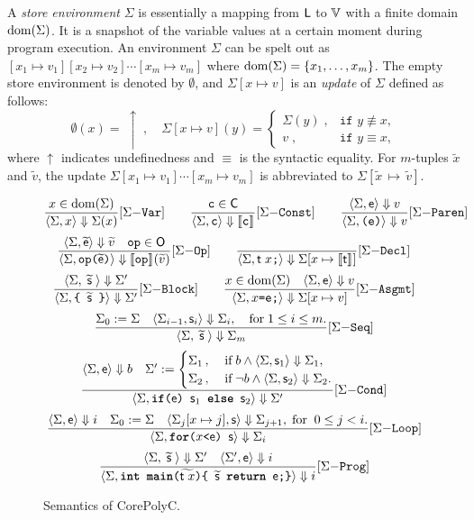 \documentclass[runningheads]{llncs}
\begin{document}
A \textit{store environment} $\Sigma$ is essentially a mapping from $\mathsf{L}$ to $\mathbb{V}$ with a finite domain $\mathrm{dom}(\Sigma)$.
It is a snapshot of the variable values at a certain moment during program execution.
An environment $\Sigma$ can be spelt out as $[x_1\mapsto v_1][x_2\mapsto v_2]\cdots[x_m\mapsto v_m]$ where $\mathrm{dom}(\Sigma)=\{x_1,\dots,x_m\}$.
The empty store environment is denoted by $\emptyset$, and $\Sigma[x\mapsto v]$ is an \textit{update} of $\Sigma$ defined as follows:
\begin{equation}
    \emptyset(x)= \;\uparrow\;,\quad\Sigma[x\mapsto v](y)=\begin{cases}\Sigma(y)\;, &\texttt{if }y\not\equiv x, \\v\;, &\texttt{if }y\equiv x, \end{cases}
\end{equation}
where $\uparrow$ indicates undefinedness and $\equiv$ is the syntactic equality.
For $m$-tuples $\widetilde{x}$ and $\widetilde{v}$, the update $\Sigma[x_1\mapsto v_1]\cdots[x_m\mapsto v_m]$ is abbreviated to $\Sigma[\widetilde{x}\,\mapsto\,\widetilde{v}]$.


\begin{figure}[t]
    \centering
    \[
    \frac{x\in\mathrm{dom}(\Sigma)}{\langle\Sigma,x\rangle\Downarrow{\Sigma(x)}}[\Sigma\mathtt{-Var}]\qquad
    \frac{\mathtt{c}\in\mathsf{C}}{\langle\Sigma,\mathtt{c}\rangle\Downarrow{\llbracket\mathtt{c}\rrbracket_{}}}[\Sigma\mathtt{-Const}]\qquad
    \frac{\langle\Sigma,\mathsf{e}\rangle\Downarrow{v}}{\langle\Sigma,\texttt{(e)}\rangle\Downarrow{v}}[\Sigma\mathtt{-Paren}]
    \]
    \[
    \frac{\langle\Sigma,\widetilde{\mathsf{e}}\rangle\Downarrow{\widetilde{v}}\quad \mathtt{op}\in\mathsf{O}}{\langle\Sigma,\texttt{op($\widetilde{\mathsf{e}}$)}\rangle\Downarrow{\llbracket\mathtt{op}\rrbracket_{}(\widetilde{v})}}[\Sigma\mathtt{-Op}]\qquad
    \frac{}{\langle\Sigma,\mathsf{t}\;x\texttt{;}\rangle\Downarrow{\Sigma[x\mapsto{\llbracket\mathsf{t}\rrbracket_{}}]}}[\Sigma\mathtt{-Decl}]\]
    \[
    \frac{\langle\Sigma,\;\widetilde{\mathsf{s}}\;\rangle\Downarrow{\Sigma'}}{\langle\Sigma,\texttt{\{ }\widetilde{\mathsf{s}}\texttt{ \}}\rangle\Downarrow{\Sigma'}}[\Sigma\mathtt{-Block}]\qquad
    \frac{x\in\mathrm{dom}(\Sigma)\quad \langle\Sigma,\mathsf{e}\rangle\Downarrow{v}}{\langle\Sigma,\texttt{$x$=e;}\rangle\Downarrow{\Sigma[x\mapsto{v}]}}[\Sigma\mathtt{-Asgmt}]
    \]
    \[
    \frac{\Sigma_0:=\Sigma\quad\langle\Sigma_{i-1},\mathsf{s}_i\rangle\Downarrow{\Sigma_{i}} ,\quad\text{for}\;1\le i\le m.}{\langle\Sigma,\;\widetilde{\mathsf{s}}\;\rangle\Downarrow{\Sigma_m}}[\Sigma\mathtt{-Seq}]\]
    \[
    \frac{\langle\Sigma,\mathsf{e}\rangle\Downarrow{b}\quad \Sigma':=\begin{cases}\Sigma_1\,,\;&\text{if}\;b\land \langle\Sigma,\mathsf{s}_1\rangle\Downarrow{\Sigma_1}, \\
    \Sigma_2\,,\;&\text{if}\;\lnot b\land \langle\Sigma,\mathsf{s}_2\rangle\Downarrow{\Sigma_2}.\end{cases}}{\langle\Sigma,\texttt{\textbf{if}(}\mathsf{e}\texttt{) } \mathsf{s}_1 \texttt{ \textbf{else} } \mathsf{s}_2\rangle\Downarrow{\Sigma'}}[\Sigma\mathtt{-Cond}]
    \]
    \[
    \frac{\langle\Sigma,\mathsf{e}\rangle\Downarrow{i}\quad\Sigma_0:=\Sigma\quad\langle\Sigma_{j}[x\mapsto j],\mathsf{s}\rangle\Downarrow{\Sigma_{j+1}},\;\text{for}\;\;0\le j< i.}{\langle\Sigma,\texttt{\textbf{for}(}x \texttt{<} \mathsf{e} \texttt{) } \mathsf{s}\rangle\Downarrow{\Sigma_{i}}}[\Sigma\mathtt{-Loop}]
    \]
    \[
    \frac{\langle\Sigma,\;\widetilde{\mathsf{s}}\;\rangle\Downarrow{\Sigma'}\quad\langle\Sigma',\mathsf{e}\rangle\Downarrow{i}}{\langle\Sigma,\texttt{\textbf{int} \textbf{main}(}\widetilde{\mathsf{t}\;x}\texttt{)\{ }\widetilde{\mathsf{s}}\texttt{ \textbf{return} }\mathsf{e}\texttt{;\}}\rangle\Downarrow{i}}[\Sigma\mathtt{-Prog}]
    \]
    \caption{Semantics of CorePolyC.}
    \label{fig:semantics}
\end{figure}
\end{document}
